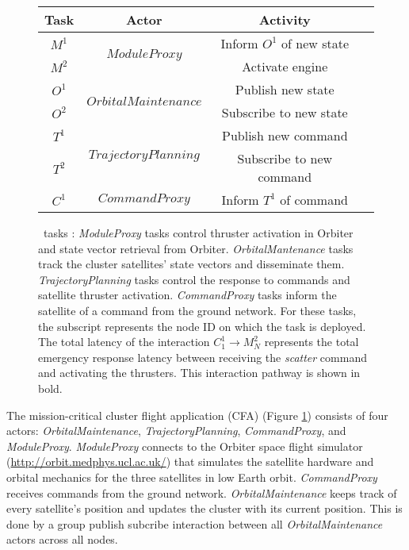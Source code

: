 \begin{figure}[t]
\begin{footnotesize}
\begin{tabular}{| c | c | c | p{4cm} |}
\hline
Task & Actor & Activity \\ [0.5ex]
\hline
$M^1$ & \multirow{2}{*}{$ModuleProxy$} &  Inform $O^1$ of new state\\
\cline{1-1}\cline{3-3}
$M^2$ & & Activate engine\\
\hline
$O^1$ & \multirow{2}{*}{$OrbitalMaintenance$} & Publish new state\\
\cline{1-1}\cline{3-3}
$O^2$ & & Subscribe to new state\\
\hline
$T^1$ & \multirow{2}{*}{$TrajectoryPlanning$} & Publish new command\\
\cline{1-1}\cline{3-3}
$T^2$ & & Subscribe to new command\\
\hline
$C^1$ & $CommandProxy$ & Inform $T^1$ of command\\
\hline
\end{tabular}
\end{footnotesize}

\caption{\iap\ tasks : 
\emph{ModuleProxy} tasks control thruster activation in Orbiter and state vector retrieval from Orbiter.
\emph{OrbitalMantenance} tasks track the cluster satellites' state vectors and disseminate them.  
\emph{TrajectoryPlanning} tasks control the response to commands and satellite thruster activation.
\emph{CommandProxy} tasks inform the satellite of a command from the ground network.  
For these tasks, the subscript represents the node ID on which the task is deployed.
The total latency of the interaction $C_1^1 \to M_N^2$ represents the total emergency response latency
between receiving the \emph{scatter} command and activating the thrusters.  This interaction pathway 
is shown in bold.
}
\label{fig:OrbiterDemoTDG}
\vspace{-0.2in}
\end{figure}

The mission-critical cluster flight application (CFA) (Figure \ref{fig:OrbiterDemoTDG}) consists of four actors: \emph{OrbitalMaintenance}, \emph{TrajectoryPlanning}, \emph{CommandProxy}, and \emph{ModuleProxy}. \emph{ModuleProxy} connects to the Orbiter space
flight simulator (\url{http://orbit.medphys.ucl.ac.uk/}) that simulates the satellite hardware and orbital mechanics for the three satellites in low Earth orbit. \emph{CommandProxy} receives commands from the ground network.  \emph{OrbitalMaintenance} keeps track of every satellite's position and updates the cluster with its current position. This is done by a group publish subcribe interaction between all \textit{OrbitalMaintenance} actors across all nodes.  

